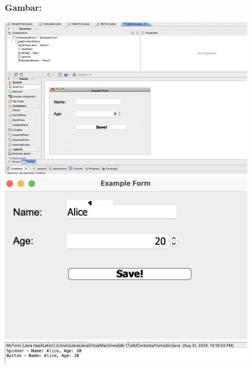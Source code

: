 \textbf{Gambar:} \\
\begin{center}
	\includegraphics[width=0.8\textwidth]{assets/pertemuan11/myform_window_builder.png}
	\includegraphics[width=0.8\textwidth]{assets/pertemuan11/myform.png}
	\includegraphics[width=0.8\textwidth]{assets/pertemuan11/myform_result.png}
\end{center}


